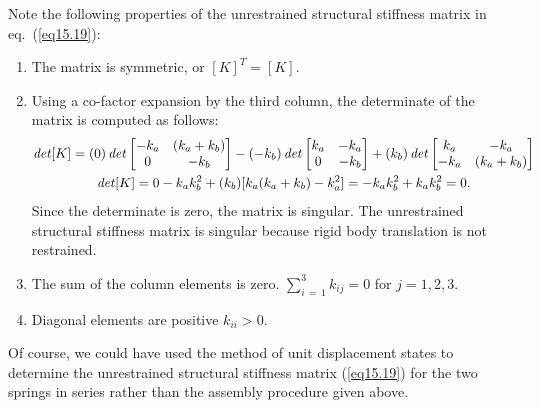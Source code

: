 \documentclass{AeroStructure-ERJohnson}
\begin{document}
Note the following properties of the unrestrained structural stiffness matrix in eq.~(\ref{eq15.19}):
\begin{enumerate}
\item The matrix is symmetric, or $[K]^{T}=[K]$.
\item Using a co-factor expansion by the third column, the determinate of the matrix is computed as follows:
\begin{gather*}
\operatorname{\it det}[K]=(0) \operatorname{\it det}\left[\begin{array}{@{}cc@{}}-k_{a} & (k_{a}+k_{b}) \\ 0 & -k_{b}\end{array}\right]-(-k_{b}) \operatorname{\it det}\left[\begin{array}{@{}cc@{}}k_{a} & -k_{a} \\ 0 & -k_{b}\end{array}\right]+\left(k_{b}\right) \operatorname{\it det}\left[\begin{array}{@{}cc@{}}k_{a} & -k_{a} \\-k_{a} & (k_{a}+k_{b})\end{array}\right] \\ \operatorname{\it det}[K]=0-k_{a} k_{b}^{2}+(k_{b})[k_{a}(k_{a}+k_{b})-k_{a}^{2}]=-k_{a} k_{b}^{2}+k_{a} k_{b}^{2}=0.
\end{gather*}
Since the determinate is zero, the matrix is singular. The unrestrained structural stiffness matrix is singular because rigid body translation is not restrained.

\item The sum of the column elements is zero. $\sum\limits_{i\,=\,1}^3 k_{i j}=0$ for $j=1,2,3$.

\item Diagonal elements are positive $k_{i i}>0$.
\end{enumerate}

Of course, we could have used the method of unit displacement states to determine the unrestrained structural stiffness matrix (\ref{eq15.19}) for the two springs in series rather than the assembly procedure given above.
\end{document}
